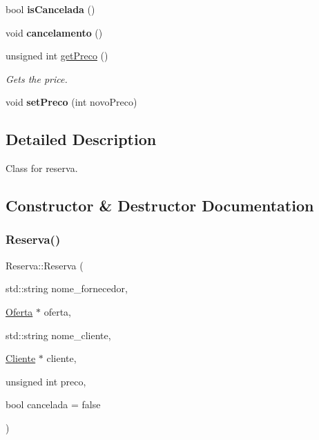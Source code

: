 \begin{DoxyCompactItemize}
\item 
\mbox{\label{classReserva_a1fb3e7e1dfce5960dc888ac9929f014f}} 
bool {\bfseries is\+Cancelada} ()
\item 
\mbox{\label{classReserva_a05435b60142460ad2b0ccf61b7ea4531}} 
void {\bfseries cancelamento} ()
\item 
unsigned int \hyperlink{classReserva_a7d6a55cda46a28d62af5870c98cbc3d5}{get\+Preco} ()
\begin{DoxyCompactList}\small\item\em Gets the price. \end{DoxyCompactList}\item 
\mbox{\label{classReserva_ac2d3c756eb1abc03f0661cc97e1600e6}} 
void {\bfseries set\+Preco} (int novo\+Preco)
\end{DoxyCompactItemize}


\subsection{Detailed Description}
Class for reserva. 

\subsection{Constructor \& Destructor Documentation}
\mbox{\label{classReserva_a96145a1381e9a9e5bb2091bb17e1d496}} 
\subsubsection{\texorpdfstring{Reserva()}{Reserva()}}
{\footnotesize\ttfamily Reserva\+::\+Reserva (\begin{DoxyParamCaption}\item[{std\+::string}]{nome\+\_\+fornecedor,  }\item[{\hyperlink{classOferta}{Oferta} $\ast$}]{oferta,  }\item[{std\+::string}]{nome\+\_\+cliente,  }\item[{\hyperlink{classCliente}{Cliente} $\ast$}]{cliente,  }\item[{unsigned int}]{preco,  }\item[{bool}]{cancelada = {\ttfamily false} }\end{DoxyParamCaption})}



